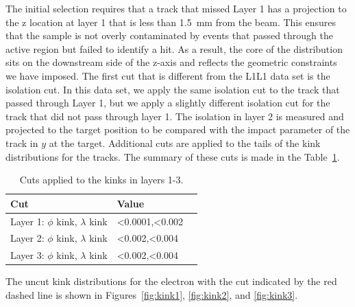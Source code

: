 The initial selection requires that a track that missed Layer 1 has a projection to the z location at layer 1 that is less than 1.5~mm from the beam. This ensures that the sample is not overly contaminated by events that passed through the active region but failed to identify a hit. As a result, the core of the distribution sits on the downstream side of the z-axis and reflects the geometric constraints we have imposed. The first cut that is different from the L1L1 data set is the isolation cut. In this data set, we apply the same isolation cut to the track that passed through Layer 1, but we apply a slightly different isolation cut for the track that did not pass through layer 1. The isolation in layer 2 is measured and projected to the target position to be compared with the impact parameter of the track in $y$ at the target. Additional cuts are applied to the tails of the kink distributions for the tracks. The summary of these cuts is made in the Table~\ref{kink_cuts}.

\begin{table}[H]
\caption{Cuts applied to the kinks in layers 1-3.}
\label{kink_cuts}
\centering
\begin{tabular}{lll}
\toprule
Cut & Value \\
\midrule
Layer 1: $\phi$ kink, $\lambda$ kink & <0.0001,<0.002\\
Layer 2: $\phi$ kink, $\lambda$ kink & <0.002,<0.004\\
Layer 3: $\phi$ kink, $\lambda$ kink & <0.002,<0.004\\
\bottomrule
\end{tabular}
\end{table}

The uncut kink distributions for the electron with the cut indicated by the red dashed line is shown in Figures~\ref{fig:kink1}, \ref{fig:kink2}, and \ref{fig:kink3}.

